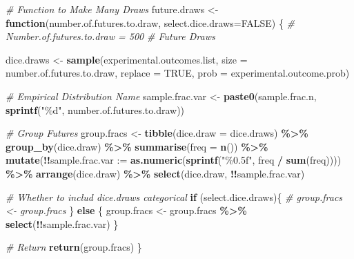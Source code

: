 \documentclass[
]{book}
\newenvironment{Shaded}{\begin{snugshade}}{\end{snugshade}}
\newcommand{\CommentTok}[1]{\textcolor[rgb]{0.56,0.35,0.01}{\textit{#1}}}
\newcommand{\ControlFlowTok}[1]{\textcolor[rgb]{0.13,0.29,0.53}{\textbf{#1}}}
\newcommand{\DataTypeTok}[1]{\textcolor[rgb]{0.13,0.29,0.53}{#1}}
\newcommand{\KeywordTok}[1]{\textcolor[rgb]{0.13,0.29,0.53}{\textbf{#1}}}
\newcommand{\NormalTok}[1]{#1}
\newcommand{\OperatorTok}[1]{\textcolor[rgb]{0.81,0.36,0.00}{\textbf{#1}}}
\newcommand{\OtherTok}[1]{\textcolor[rgb]{0.56,0.35,0.01}{#1}}
\newcommand{\StringTok}[1]{\textcolor[rgb]{0.31,0.60,0.02}{#1}}
\begin{document}
\begin{Shaded}
\begin{Highlighting}[]
\CommentTok{\# Function to Make Many Draws}
\NormalTok{future.draws \textless{}{-}}\StringTok{ }\ControlFlowTok{function}\NormalTok{(number.of.futures.to.draw, }\DataTypeTok{select.dice.draws=}\OtherTok{FALSE}\NormalTok{) \{}
    \CommentTok{\# Number.of.futures.to.draw = 500}
    \CommentTok{\# Future Draws}

\NormalTok{    dice.draws \textless{}{-}}\StringTok{ }\KeywordTok{sample}\NormalTok{(experimental.outcomes.list,}
                      \DataTypeTok{size =}\NormalTok{ number.of.futures.to.draw,}
                      \DataTypeTok{replace =} \OtherTok{TRUE}\NormalTok{,}
                      \DataTypeTok{prob =}\NormalTok{ experimental.outcome.prob)}

    \CommentTok{\# Empirical Distribution Name}
\NormalTok{    sample.frac.var \textless{}{-}}\StringTok{ }\KeywordTok{paste0}\NormalTok{(}\StringTok{\textquotesingle{}sample.frac.n\textquotesingle{}}\NormalTok{, }\KeywordTok{sprintf}\NormalTok{(}\StringTok{"\%d"}\NormalTok{, number.of.futures.to.draw))}

    \CommentTok{\# Group Futures}
\NormalTok{    group.fracs \textless{}{-}}\StringTok{ }\KeywordTok{tibble}\NormalTok{(}\DataTypeTok{dice.draw =}\NormalTok{ dice.draws) }\OperatorTok{\%\textgreater{}\%}
\StringTok{                    }\KeywordTok{group\_by}\NormalTok{(dice.draw) }\OperatorTok{\%\textgreater{}\%}
\StringTok{                    }\KeywordTok{summarise}\NormalTok{(}\DataTypeTok{freq =} \KeywordTok{n}\NormalTok{()) }\OperatorTok{\%\textgreater{}\%}
\StringTok{                    }\KeywordTok{mutate}\NormalTok{(}\OperatorTok{!!}\DataTypeTok{sample.frac.var :=}
                           \KeywordTok{as.numeric}\NormalTok{(}\KeywordTok{sprintf}\NormalTok{(}\StringTok{"\%0.5f"}\NormalTok{, freq }\OperatorTok{/}\StringTok{ }\KeywordTok{sum}\NormalTok{(freq)))) }\OperatorTok{\%\textgreater{}\%}
\StringTok{                    }\KeywordTok{arrange}\NormalTok{(dice.draw) }\OperatorTok{\%\textgreater{}\%}
\StringTok{                    }\KeywordTok{select}\NormalTok{(dice.draw, }\OperatorTok{!!}\NormalTok{sample.frac.var)}

    \CommentTok{\# Whether to includ dice.draws categorical}
    \ControlFlowTok{if}\NormalTok{ (select.dice.draws)\{}
\CommentTok{\#         group.fracs \textless{}{-} group.fracs}
\NormalTok{    \} }\ControlFlowTok{else}\NormalTok{ \{}
\NormalTok{        group.fracs \textless{}{-}}\StringTok{ }\NormalTok{group.fracs }\OperatorTok{\%\textgreater{}\%}\StringTok{ }\KeywordTok{select}\NormalTok{(}\OperatorTok{!!}\NormalTok{sample.frac.var)}
\NormalTok{    \}}

    \CommentTok{\# Return}
    \KeywordTok{return}\NormalTok{(group.fracs)}
\NormalTok{\}}
\end{Highlighting}
\end{Shaded}
\end{document}
